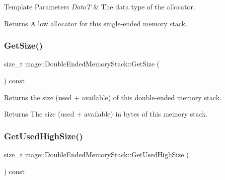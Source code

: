 \begin{DoxyTemplParams}{Template Parameters}
{\em DataT} & The data type of the allocator. \\
\hline
\end{DoxyTemplParams}
\begin{DoxyReturn}{Returns}
A low allocator for this single-\/ended memory stack. 
\end{DoxyReturn}
\mbox{\label{classmage_1_1_double_ended_memory_stack_a68d69d69243d5ef8a9fd12b7d7a42993}} 
\subsubsection{\texorpdfstring{Get\+Size()}{GetSize()}}
{\footnotesize\ttfamily size\+\_\+t mage\+::\+Double\+Ended\+Memory\+Stack\+::\+Get\+Size (\begin{DoxyParamCaption}{ }\end{DoxyParamCaption}) const\hspace{0.3cm}{\ttfamily [noexcept]}}

Returns the size (used + available) of this double-\/ended memory stack.

\begin{DoxyReturn}{Returns}
The size (used + available) in bytes of this memory stack. 
\end{DoxyReturn}
\mbox{\label{classmage_1_1_double_ended_memory_stack_a1c037a0084cfa806c6a519fd3208cd49}} 
\subsubsection{\texorpdfstring{Get\+Used\+High\+Size()}{GetUsedHighSize()}}
{\footnotesize\ttfamily size\+\_\+t mage\+::\+Double\+Ended\+Memory\+Stack\+::\+Get\+Used\+High\+Size (\begin{DoxyParamCaption}{ }\end{DoxyParamCaption}) const\hspace{0.3cm}{\ttfamily [noexcept]}}

